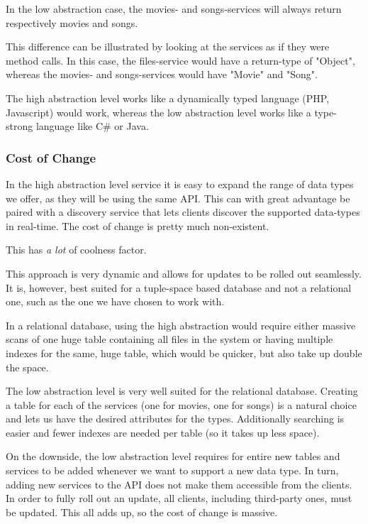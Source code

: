 In the low abstraction case, the movies- and songs-services will always return
respectively movies and songs.

This difference can be illustrated by looking at the services as if they were method calls.
In this case, the files-service would have a return-type of "Object", whereas the movies-
and songs-services would have "Movie" and "Song".

The high abstraction level works like a dynamically typed language (PHP, Javascript) would
work, whereas the low abstraction level works like a type-strong language like C\# or Java.

\subsubsection{Cost of Change}
In the high abstraction level service it is easy to expand the range of data types we offer,
as they will be using the same API. This can with great advantage be paired with a discovery
service that lets clients discover the supported data-types in real-time. The cost of change
is pretty much non-existent.

This has \emph{a lot} of coolness factor.

This approach is very dynamic and allows for updates to be rolled out seamlessly. It is, however,
best suited for a tuple-space based database and not a relational one, such as the one we have
chosen to work with.

In a relational database, using the high abstraction would require either
massive scans of one huge table containing all files in the system or having
multiple indexes for the same, huge table, which would be quicker, but also
take up double the space.

The low abstraction level is very well suited for the relational database.
Creating a table for each of the services (one for movies, one for songs) is a
natural choice and lets us have the desired attributes for the types.
Additionally searching is easier and fewer indexes are needed per table (so it
takes up less space).

On the downside, the low abstraction level requires for entire new tables and services to be added
whenever we want to support a new data type. In turn, adding new services to the API does not make
them accessible from the clients. In order to fully roll out an update, all clients,
including third-party ones, must be updated. This all adds up, so the cost of change is massive.

